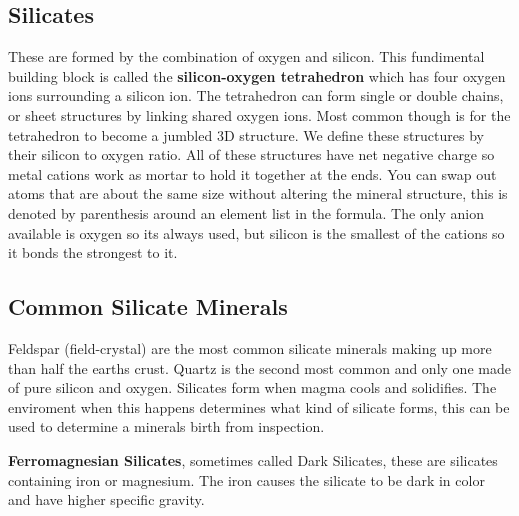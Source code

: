 \documentclass{article}
\begin{document}
\subsection*{Silicates} %
\label{sub:silicates}
These are formed by the combination of oxygen and silicon. This fundimental building block is called the \textbf{silicon-oxygen tetrahedron} which has four oxygen ions surrounding a silicon ion. The tetrahedron can  form single or double chains, or sheet structures by linking shared oxygen ions. Most common though is for the tetrahedron to become a jumbled 3D structure. We define these structures by their silicon to oxygen ratio. All of these structures have net negative charge so metal cations work as mortar to hold it together at the ends. You can swap out atoms that are about the same size without altering the mineral structure, this is denoted by parenthesis around an element list in the formula. The only anion available is oxygen so its always used, but silicon is the smallest of the cations so it bonds the strongest to it.

\subsection*{Common Silicate Minerals} %
\label{sub:common_silicate_minerals}
Feldspar (field-crystal) are the most common silicate minerals making up more than half the earths crust. Quartz is the second most common and only one made of pure silicon and oxygen. Silicates form when magma cools and solidifies. The enviroment when this happens determines what kind of silicate forms, this can be used to determine a minerals birth from inspection.

\textbf{Ferromagnesian Silicates}, sometimes called Dark Silicates, these are silicates containing iron or magnesium. The iron causes the silicate to be dark in color and have higher specific gravity.
\end{document}

